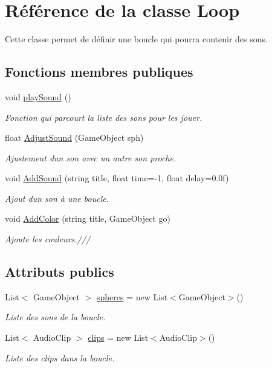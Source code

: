 \hypertarget{class_loop}{}\section{Référence de la classe Loop}
\label{class_loop}


Cette classe permet de définir une boucle qui pourra contenir des sons.  


\subsection*{Fonctions membres publiques}
\begin{DoxyCompactItemize}
\item 
void \hyperlink{class_loop_a3a228a27bd11fd29c62845024654e68b}{play\+Sound} ()
\begin{DoxyCompactList}\small\item\em Fonction qui parcourt la liste des sons pour les jouer. \end{DoxyCompactList}\item 
float \hyperlink{class_loop_ac69e73a7f3b87ecdc51e3840505b6599}{Adjust\+Sound} (Game\+Object sph)
\begin{DoxyCompactList}\small\item\em Ajustement d\textquotesingle{}un son avec un autre son proche. \end{DoxyCompactList}\item 
void \hyperlink{class_loop_a728f506b8fb86bd3cc1701f8cd42b403}{Add\+Sound} (string title, float time=-\/1, float delay=0.\+0f)
\begin{DoxyCompactList}\small\item\em Ajout d\textquotesingle{}un son à une boucle. \end{DoxyCompactList}\item 
void \hyperlink{class_loop_afe51ea74b1e2bb59e3c22be8247134be}{Add\+Color} (string title, Game\+Object go)
\begin{DoxyCompactList}\small\item\em Ajoute les couleurs./// \end{DoxyCompactList}\end{DoxyCompactItemize}
\subsection*{Attributs publics}
\begin{DoxyCompactItemize}
\item 
List$<$ Game\+Object $>$ \hyperlink{class_loop_a49058954a754656c000691d0ea34d332}{spheres} = new List$<$Game\+Object$>$()
\begin{DoxyCompactList}\small\item\em Liste des sons de la boucle. \end{DoxyCompactList}\item 
List$<$ Audio\+Clip $>$ \hyperlink{class_loop_a900e93bdf5d703ce8bf4f12fa754e022}{clips} = new List$<$Audio\+Clip$>$()
\begin{DoxyCompactList}\small\item\em Liste des clips dans la boucle. \end{DoxyCompactList}\end{DoxyCompactItemize}
